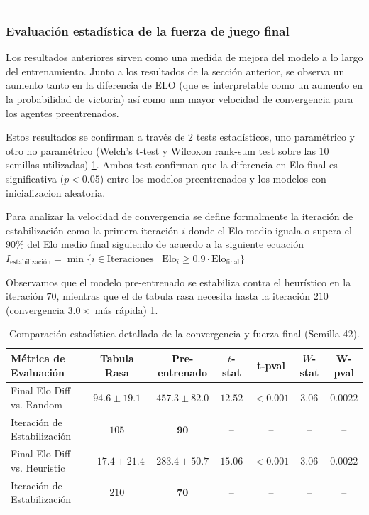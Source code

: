 \documentclass[12pt, a4paper]{article}
\begin{document}
\rule{\textwidth}{0.2pt}
\subsubsection{Evaluación estadística de la fuerza de juego final}

Los resultados anteriores sirven como una medida de mejora del modelo a lo largo del entrenamiento. Junto a los resultados de la sección anterior, se observa un aumento tanto en la diferencia de ELO (que es interpretable como un aumento en la probabilidad de victoria) así como una mayor velocidad de convergencia para los agentes preentrenados.

Estos resultados se confirman a través de 2 tests estadísticos, uno paramétrico y otro no paramétrico (Welch's t-test y Wilcoxon rank-sum test sobre las 10 semillas utilizadas) \ref{tab:hip3_stats}. Ambos test confirman que la diferencia en Elo final es  significativa ($p < 0.05$) entre los modelos preentrenados y los modelos con inicializacion aleatoria. 

Para analizar la velocidad de convergencia se define formalmente la iteración de estabilización como la primera iteración $i$ donde el Elo medio iguala o supera el $90\%$ del Elo medio final siguiendo de acuerdo a la siguiente ecuación $I_{\text{estabilización}} = \min \{ i \in \text{Iteraciones} \mid \text{Elo}_i \ge 0.9 \cdot \text{Elo}_{\text{final}} \}$

Observamos que el modelo pre-entrenado se estabiliza contra el heurístico en la iteración $70$, mientras que el de tabula rasa necesita hasta la iteración $210$ (convergencia $3.0\times$ más rápida) \ref{tab:hip3_stats}. 

\begin{table}[htbp]
    \centering
    \begin{tabular}{|l|c|c|c|c|c|c|}
    \hline
    \textbf{Métrica de Evaluación} & \textbf{Tabula Rasa} & \textbf{Pre-entrenado} & \textbf{$t$-stat} & \textbf{t-pval} & \textbf{$W$-stat} & \textbf{W-pval} \\
    \hline
    Final Elo Diff vs. Random & $94.6 \pm 19.1$ & $\mathbf{457.3 \pm 82.0}$ & $12.52$ & $< 0.001$ & $3.06$ & $0.0022$ \\
    Iteración de Estabilización & $105$ & $\mathbf{90}$ & -- & -- & -- & -- \\
    \hline
    Final Elo Diff vs. Heuristic & $-17.4 \pm 21.4$ & $\mathbf{283.4 \pm 50.7}$ & $15.06$ & $< 0.001$ & $3.06$ & $0.0022$ \\
    Iteración de Estabilización & $210$ & $\mathbf{70}$ & -- & -- & -- & -- \\
    \hline
    \end{tabular}
    \caption[Comparación estadística de convergencia]{Comparación estadística detallada de la convergencia y fuerza final (Semilla 42).}
    \label{tab:hip3_stats}
\end{table}
\end{document}
